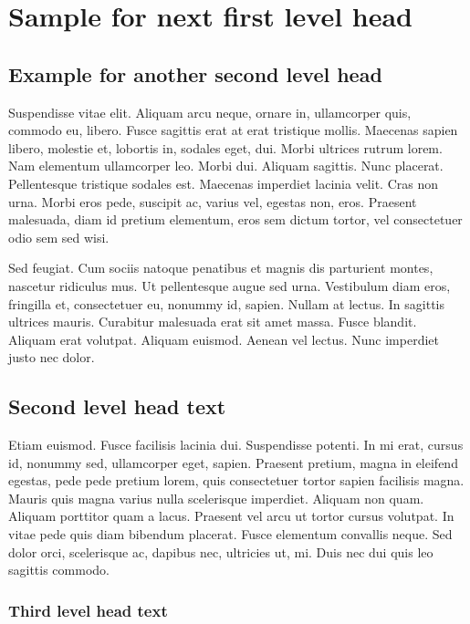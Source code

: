 \documentclass[APA,STIX1COL]{WileyNJD-v2}
\begin{document}
\section{Sample for next first level head}\label{sec3}

\subsection{Example for another second level head}

Suspendisse vitae elit. Aliquam arcu neque, ornare in, ullamcorper quis, commodo eu, libero. Fusce sagittis erat at
erat tristique mollis. Maecenas sapien libero, molestie et, lobortis in, sodales eget, dui. Morbi ultrices rutrum lorem.
Nam elementum ullamcorper leo. Morbi dui. Aliquam sagittis. Nunc placerat. Pellentesque tristique sodales est.
Maecenas imperdiet lacinia velit. Cras non urna. Morbi eros pede, suscipit ac, varius vel, egestas non, eros. Praesent
malesuada, diam id pretium elementum, eros sem dictum tortor, vel consectetuer odio sem sed wisi.

Sed feugiat. Cum sociis natoque penatibus et magnis dis parturient montes, nascetur ridiculus mus. Ut pellentesque
augue sed urna. Vestibulum diam eros, fringilla et, consectetuer eu, nonummy id, sapien. Nullam at lectus. In sagittis
ultrices mauris. Curabitur malesuada erat sit amet massa. Fusce blandit. Aliquam erat volutpat. Aliquam euismod.
Aenean vel lectus. Nunc imperdiet justo nec dolor.

\subsection{Second level head text}

Etiam euismod. Fusce facilisis lacinia dui. Suspendisse potenti. In mi erat, cursus id, nonummy sed, ullamcorper
eget, sapien. Praesent pretium, magna in eleifend egestas, pede pede pretium lorem, quis consectetuer tortor sapien
facilisis magna. Mauris quis magna varius nulla scelerisque imperdiet. Aliquam non quam. Aliquam porttitor quam
a lacus. Praesent vel arcu ut tortor cursus volutpat. In vitae pede quis diam bibendum placerat. Fusce elementum
convallis neque. Sed dolor orci, scelerisque ac, dapibus nec, ultricies ut, mi. Duis nec dui quis leo sagittis commodo.


\subsubsection{Third level head text}
\end{document}
